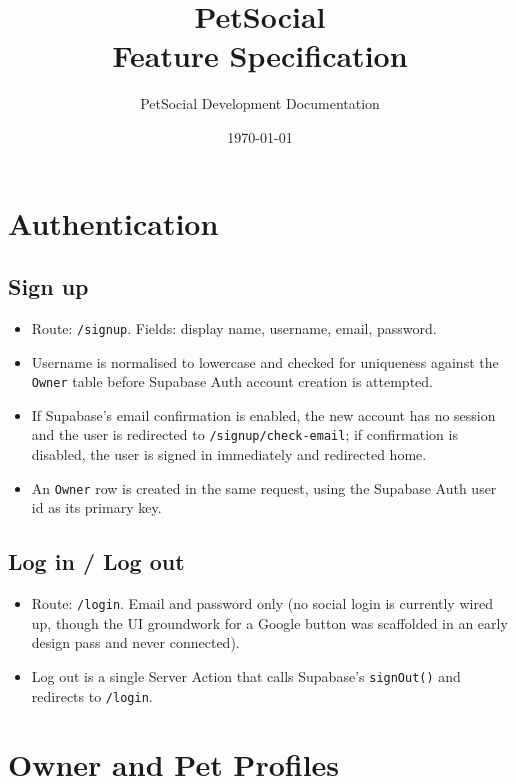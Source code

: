 \documentclass[11pt,a4paper]{article}
\title{PetSocial\\\large Feature Specification}
\author{PetSocial Development Documentation}
\date{\today}
\begin{document}
\maketitle
\thispagestyle{fancy}
\tableofcontents

\section{Authentication}
\subsection{Sign up}
\begin{itemize}[leftmargin=*]
  \item Route: \texttt{/signup}. Fields: display name, username, email, password.
  \item Username is normalised to lowercase and checked for uniqueness against the
        \texttt{Owner} table before Supabase Auth account creation is attempted.
  \item If Supabase's email confirmation is enabled, the new account has no session and
        the user is redirected to \texttt{/signup/check-email}; if confirmation is
        disabled, the user is signed in immediately and redirected home.
  \item An \texttt{Owner} row is created in the same request, using the Supabase Auth
        user id as its primary key.
\end{itemize}

\subsection{Log in / Log out}
\begin{itemize}[leftmargin=*]
  \item Route: \texttt{/login}. Email and password only (no social login is currently
        wired up, though the UI groundwork for a Google button was scaffolded in an
        early design pass and never connected).
  \item Log out is a single Server Action that calls Supabase's \texttt{signOut()} and
        redirects to \texttt{/login}.
\end{itemize}

\section{Owner and Pet Profiles}
\end{document}
